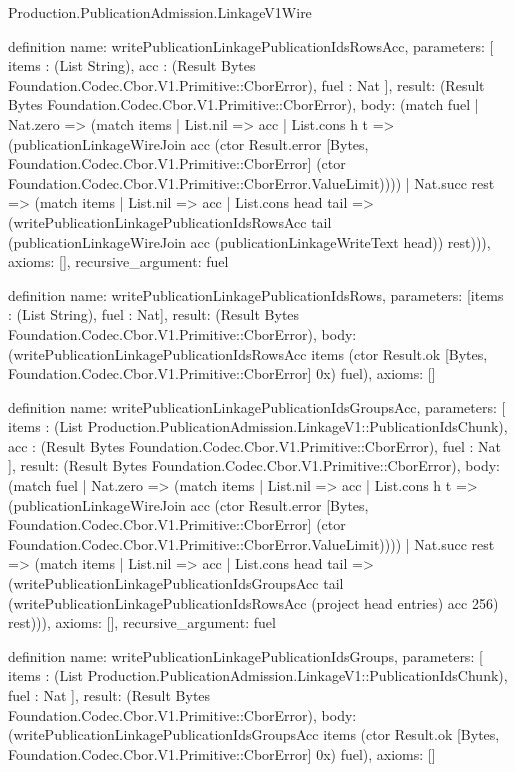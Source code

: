 \begin{lexlean}{Production.PublicationAdmission.LinkageV1Wire}
\begin{semanticmodule}
definition{
  name: writePublicationLinkagePublicationIdsRowsAcc,
  parameters: [
    items : (List String),
    acc : (Result Bytes Foundation.Codec.Cbor.V1.Primitive::CborError),
    fuel : Nat
  ],
  result: (Result Bytes Foundation.Codec.Cbor.V1.Primitive::CborError),
  body: (match fuel
    | Nat.zero => (match items
      | List.nil => acc
      | List.cons h t => (publicationLinkageWireJoin acc (ctor Result.error [Bytes, Foundation.Codec.Cbor.V1.Primitive::CborError] (ctor Foundation.Codec.Cbor.V1.Primitive::CborError.ValueLimit))))
    | Nat.succ rest => (match items
      | List.nil => acc
      | List.cons head tail => (writePublicationLinkagePublicationIdsRowsAcc tail (publicationLinkageWireJoin acc (publicationLinkageWriteText head)) rest))),
  axioms: [],
  recursive_argument: fuel
}

definition{
  name: writePublicationLinkagePublicationIdsRows,
  parameters: [items : (List String), fuel : Nat],
  result: (Result Bytes Foundation.Codec.Cbor.V1.Primitive::CborError),
  body: (writePublicationLinkagePublicationIdsRowsAcc items (ctor Result.ok [Bytes, Foundation.Codec.Cbor.V1.Primitive::CborError] 0x) fuel),
  axioms: []
}

definition{
  name: writePublicationLinkagePublicationIdsGroupsAcc,
  parameters: [
    items : (List Production.PublicationAdmission.LinkageV1::PublicationIdsChunk),
    acc : (Result Bytes Foundation.Codec.Cbor.V1.Primitive::CborError),
    fuel : Nat
  ],
  result: (Result Bytes Foundation.Codec.Cbor.V1.Primitive::CborError),
  body: (match fuel
    | Nat.zero => (match items
      | List.nil => acc
      | List.cons h t => (publicationLinkageWireJoin acc (ctor Result.error [Bytes, Foundation.Codec.Cbor.V1.Primitive::CborError] (ctor Foundation.Codec.Cbor.V1.Primitive::CborError.ValueLimit))))
    | Nat.succ rest => (match items
      | List.nil => acc
      | List.cons head tail => (writePublicationLinkagePublicationIdsGroupsAcc tail (writePublicationLinkagePublicationIdsRowsAcc (project head entries) acc 256) rest))),
  axioms: [],
  recursive_argument: fuel
}

definition{
  name: writePublicationLinkagePublicationIdsGroups,
  parameters: [
    items : (List Production.PublicationAdmission.LinkageV1::PublicationIdsChunk),
    fuel : Nat
  ],
  result: (Result Bytes Foundation.Codec.Cbor.V1.Primitive::CborError),
  body: (writePublicationLinkagePublicationIdsGroupsAcc items (ctor Result.ok [Bytes, Foundation.Codec.Cbor.V1.Primitive::CborError] 0x) fuel),
  axioms: []
}


\end{semanticmodule}
\end{lexlean}
